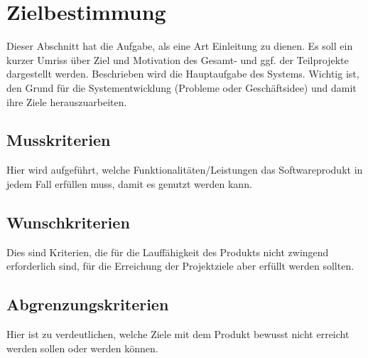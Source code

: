 
\chapter{Zielbestimmung}

Dieser Abschnitt hat die Aufgabe, als eine Art Einleitung zu dienen. Es soll
ein kurzer Umriss über Ziel und Motivation des Gesamt- und ggf. der
Teilprojekte dargestellt werden. Beschrieben wird die Hauptaufgabe des Systems.
Wichtig ist, den Grund für die Systementwicklung (Probleme oder Geschäftsidee)
und damit ihre Ziele herauszuarbeiten.
\section{Musskriterien}

Hier wird aufgeführt, welche Funktionalitäten/Leistungen das Softwareprodukt in
jedem Fall erfüllen muss, damit es genutzt werden kann.
\section{Wunschkriterien}
Dies sind Kriterien, die für die Lauffähigkeit des Produkts nicht zwingend
erforderlich sind, für die Erreichung der Projektziele aber erfüllt werden
sollten.

\section{Abgrenzungskriterien}
Hier ist zu verdeutlichen, welche Ziele mit dem Produkt bewusst nicht erreicht
werden sollen oder werden können.
